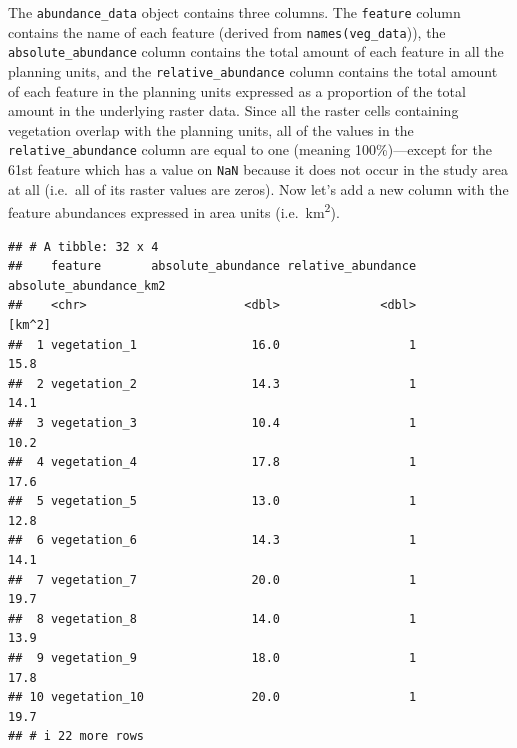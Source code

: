 \documentclass[
  12pt,
]{book}
\newenvironment{Shaded}{\begin{snugshade}}{\end{snugshade}}
\newcommand{\CommentTok}[1]{\textcolor[rgb]{0.56,0.35,0.01}{\textit{#1}}}
\newcommand{\DecValTok}[1]{\textcolor[rgb]{0.00,0.00,0.81}{#1}}
\newcommand{\FunctionTok}[1]{\textcolor[rgb]{0.00,0.00,0.00}{#1}}
\newcommand{\NormalTok}[1]{#1}
\newcommand{\OtherTok}[1]{\textcolor[rgb]{0.56,0.35,0.01}{#1}}
\newcommand{\SpecialCharTok}[1]{\textcolor[rgb]{0.00,0.00,0.00}{#1}}
\begin{document}
The \texttt{abundance\_data} object contains three columns. The \texttt{feature} column contains the name of each feature (derived from \texttt{names(veg\_data})), the \texttt{absolute\_abundance} column contains the total amount of each feature in all the planning units, and the \texttt{relative\_abundance} column contains the total amount of each feature in the planning units expressed as a proportion of the total amount in the underlying raster data. Since all the raster cells containing vegetation overlap with the planning units, all of the values in the \texttt{relative\_abundance} column are equal to one (meaning 100\%)---except for the 61st feature which has a value on \texttt{NaN} because it does not occur in the study area at all (i.e.~all of its raster values are zeros). Now let's add a new column with the feature abundances expressed in area units (i.e.~km\textsuperscript{2}).

\begin{Shaded}
\end{Shaded}

\begin{verbatim}
## # A tibble: 32 x 4
##    feature       absolute_abundance relative_abundance absolute_abundance_km2
##    <chr>                      <dbl>              <dbl>                 [km^2]
##  1 vegetation_1                16.0                  1                   15.8
##  2 vegetation_2                14.3                  1                   14.1
##  3 vegetation_3                10.4                  1                   10.2
##  4 vegetation_4                17.8                  1                   17.6
##  5 vegetation_5                13.0                  1                   12.8
##  6 vegetation_6                14.3                  1                   14.1
##  7 vegetation_7                20.0                  1                   19.7
##  8 vegetation_8                14.0                  1                   13.9
##  9 vegetation_9                18.0                  1                   17.8
## 10 vegetation_10               20.0                  1                   19.7
## # i 22 more rows
\end{verbatim}
\end{document}
